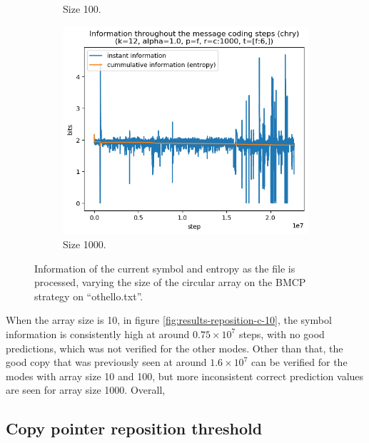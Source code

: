 \documentclass{article}
\begin{document}
\begin{figure}
\begin{subfigure}[b]{0.3\textwidth}
\begin{center}
        \end{center}
        \caption{Size 100.}
        \label{fig:results-reposition-c-100}
    \end{subfigure}
    \hfill
    \begin{subfigure}[b]{0.3\textwidth}
        \begin{center}
            \includegraphics[width=1.0\linewidth]{../scripts/images/chry_12_1.0_f_c:1000_[f:6,].png}
        \end{center}
        \caption{Size 1000.}
        \label{fig:results-reposition-c-1000}
    \end{subfigure}
    \caption{Information of the current symbol and entropy as the file is processed, varying the size of the circular array on the BMCP strategy on ``othello.txt''.}
    \label{fig:results-reposition-c}
\end{figure}

When the array size is 10, in figure \ref{fig:results-reposition-c-10}, the symbol information is consistently high at around $0.75\times10^7$ steps, with no good predictions, which was not verified for the other modes.
Other than that, the good copy that was previously seen at around $1.6\times10^7$ can be verified for the modes with array size 10 and 100, but more inconsistent correct prediction values are seen for array size 1000.
Overall, 

\subsection{Copy pointer reposition threshold}
\end{document}
